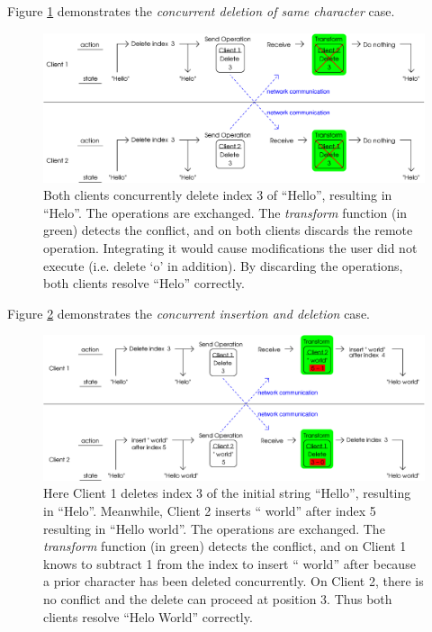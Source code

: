 \documentclass[12pt,a4paper,twoside,openright]{report}
\begin{document}
	Figure \ref{fig:ot2} demonstrates the \textit{concurrent deletion of same character} case.

	\begin{figure}[H]
	\centering
	\includegraphics[width=1\linewidth]{figs/ot2.eps}
	\caption[Operational Transformations -- concurrent deletion]{Both clients concurrently delete index 3 of ``Hello'', resulting in ``Helo''. The operations are exchanged. The \textit{transform} function (in green) detects the conflict, and on both clients discards the remote operation. Integrating it would cause modifications the user did not execute (i.e. delete `o' in addition). By discarding the operations, both clients resolve ``Helo'' correctly.}
	\label{fig:ot2}
	\end{figure}
	
	Figure \ref{fig:ot3} demonstrates the \textit{concurrent insertion and deletion} case.
	

	\begin{figure}[H]
	\centering
	\includegraphics[width=1\linewidth]{figs/ot3.eps}
	\caption[Operational Transformations -- concurrent insertion and deletion]{Here Client 1 deletes index 3 of the initial string ``Hello'', resulting in ``Helo''. Meanwhile, Client 2 inserts `` world'' after index 5 resulting in ``Hello world''. The operations are exchanged. The \textit{transform} function (in green) detects the conflict, and on Client 1 knows to subtract 1 from the index to insert `` world'' after because a prior character has been deleted concurrently. On Client 2, there is no conflict and the delete can proceed at position 3. Thus both clients resolve ``Helo World'' correctly.}
	\label{fig:ot3}
	\end{figure}
\end{document}

